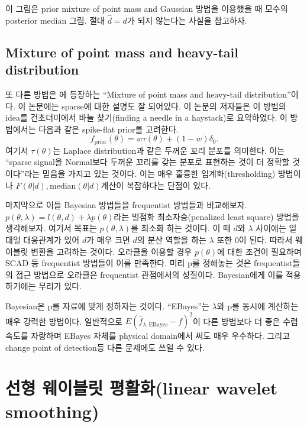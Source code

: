\documentclass[b5paper,]{scrbook}
\theoremstyle{plain}
\theoremstyle{definition}
\numberwithin{equation}{section}
\begin{document}
이 그림은 prior mixture of point mass and Gaussian 방법을 이용했을 때
모수의 posterior median 그림. 절대 \(\hat{d} = d\)가 되지 않는다는
사실을 참고하자.

\subsection{Mixture of point mass and heavy-tail
distribution}\label{mixture-of-point-mass-and-heavy-tail-distribution}

또 다른 방법은 \citep{Johnstone2005}에 등장하는 ``Mixture of point mass
and heavy-tail distribution''이다. 이 논문에는 sparse에 대한 설명도 잘
되어있다. 이 논문의 저자들은 이 방법의 idea를 건초더미에서 바늘
찾기(finding a needle in a haystack)로 요약하였다. 이 방법에서는 다음과
같은 spike-flat prior를 고려한다.
\[f_{\text{prior}}(\theta)=w \tau(\theta)+ (1-w)\delta_{0}.\] 여기서
\(\tau(\theta)\)는 Laplace distribution과 같은 두꺼운 꼬리 분포를
의미한다. 이는 ``sparse signal을 Normal보다 두꺼운 꼬리를 갖는 분포로
표현하는 것이 더 정확할 것이다''라는 믿음을 가지고 있는 것이다. 이는
매우 훌륭한 임계화(thresholding) 방법이나
\(F(\theta |d), \text{median}(\theta |d)\)계산이 복잡하다는 단점이 있다.

마지막으로 이들 Bayesian 방법들을 frequentist 방법들과 비교해보자.
\(p(\theta,\lambda)=l(\theta, d)+\lambda p(\theta)\)라는 벌점화
최소자승(penalized least square) 방법을 생각해보자. 여기서 목표는
\(p(\theta,\lambda)\)를 최소화 하는 것이다. 이 때 \(d\)와 \(\lambda\)
사이에는 일대일 대응관계가 있어 \(d\)가 매우 크면 \(d\)의 분산 역할을
하는 \(\lambda\) 또한 0이 된다. 따라서 웨이블릿 변환을 고려하는 것이다.
오라클을 이용할 경우 \(p(\theta)\)에 대한 조건이 필요하며 SCAD 등
frequentist 방법들이 이를 만족한다. 미리 p를 정해놓는 것은
frequentist들의 접근 방법으로 오라클은 frequentist 관점에서의 성질이다.
Bayesian에게 이를 적용하기에는 무리가 있다.

Bayesian은 p를 자료에 맞게 정하자는 것이다. ``EBayes''는 \(\lambda\)와
p를 동시에 계산하는 매우 강력한 방법이다. 일반적으로
\(E(\hat{f}_{\lambda, \text{EBayes}}-f)^{2}\)이 다른 방법보다 더 좋은
수렴속도를 자랑하며 EBayes 자체를 physical domain에서 써도 매우
우수하다. 그리고 change point of detection등 다른 문제에도 쓰일 수 있다.

\section{선형 웨이블릿 평활화(linear wavelet
smoothing)}\label{--linear-wavelet-smoothing}
\end{document}
